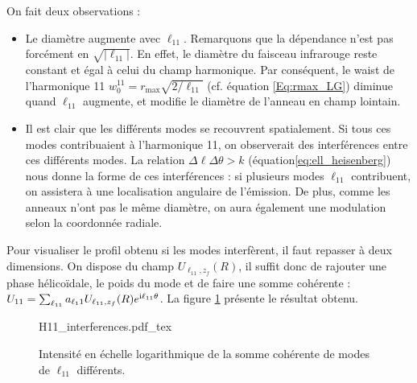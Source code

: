 On fait deux observations :
\begin{itemize} 
\item Le diamètre augmente avec $\ell_{11}$. Remarquons que la dépendance n'est pas forcément en $\sqrt{|\ell_{11}|}$. En effet, le diamètre du faisceau infrarouge reste constant et égal à celui du champ harmonique. Par conséquent, le waist de l'harmonique 11 $w_0^{11}=r_{\mathrm{max}}\sqrt{2/\ell_{11}}$ (cf. équation \ref{Eq:rmax_LG}) diminue quand $\ell_{11}$ augmente, et modifie le diamètre de l'anneau en champ lointain.\\
\item Il est clair que les différents modes se recouvrent spatialement. Si tous ces modes contribuaient à l'harmonique 11, on observerait des interférences entre ces différents modes. La relation $\Delta\ell\Delta\theta>k$ (équation\ref{eq:ell_heisenberg}) nous donne la forme de ces interférences : si plusieurs modes $\ell_{11}$ contribuent, on assistera à une localisation angulaire de l'émission. De plus, comme les anneaux n'ont pas le même diamètre, on aura également une modulation selon la coordonnée radiale.\\
\end{itemize}

Pour visualiser le profil obtenu si les modes interfèrent, il faut repasser à deux dimensions. On dispose du champ $U_{\ell_{11},z_f}(R)$, il suffit donc de rajouter une phase hélicoïdale, le poids du mode et de faire une somme cohérente : $U_{11}=\sum_{\ell_{11}} a_{\ell_11} U_{\ell_{11},z_f}(R)e^{\mathrm{i}\ell_{11}\theta}$. La figure \ref{Fig:H11_interf} présente le résultat obtenu.

\begin{figure}[!ht]
\centering
\def\svgwidth{\columnwidth}
{H11_interferences.pdf_tex}
\caption{Intensité en échelle logarithmique de la somme cohérente de modes de $\ell_{11}$ différents.}
\label{Fig:H11_interf}
\end{figure}

